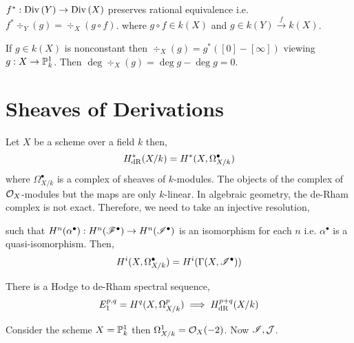 \documentclass[12pt]{article}
\begin{document}
\begin{proposition}
$f^* : \Div{Y} \to \Div{X}$ preserves rational equivalence i.e. $f^* \div_Y(g) = \div_X(g \circ f)$. where $g \circ f \in k(X)$ and $g \in k(Y) \xrightarrow{f} k(X)$. 
\end{proposition}

\begin{remark}
If $g \in k(X)$ is nonconstant then $\div_X(g) = g^*([0] - [\infty])$ viewing $g : X \to \P_k^1$. Then $\deg{\div_X(g)} = \deg{g} - \deg{g} = 0$. 
\end{remark}

\section{Sheaves of Derivations}

\begin{definition}
Let $X$ be a scheme over a field $k$ then,
\[ H^*_{\dR}(X/k) = H^*(X, \Omega^\bullet_{X/k}) \]
where $\Omega^\bullet_{X/k}$ is a complex of sheaves of $k$-modules. The objects of the complex of $\struct{X}$-modules but the maps are only $k$-linear. In algebraic geometry, the de-Rham complex is not exact. Therefore, we need to take an injective resolution,
\begin{center}
\end{center}
such that $H^n(\alpha^\bullet) : H^n(\F^\bullet) \to H^n(\I^\bullet)$ is an isomorphism for each $n$ i.e. $\alpha^\bullet$ is a quasi-isomorphism. Then,
\[ H^i(X, \Omega^\bullet_{X/k}) = H^i(\Gamma(X, \I^\bullet)) \]
\end{definition}

\begin{remark}
There is a Hodge to de-Rham spectral sequence,
\[ E^{p,q}_1 = H^q(X, \Omega_{X/k}^p) \implies H_{\dR}^{p+q}(X/k) \]
\end{remark}

\begin{example}
Consider the scheme $X = \P^1_k$ then $\Omega^1_{X/k} = \struct{X}(-2)$. Now $\I, \J$.
\end{example}
\end{document}
